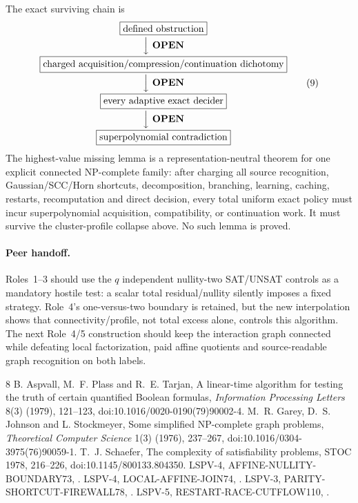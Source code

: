 \documentclass[11pt]{article}
\newcommand{\OPEN}{\textbf{OPEN}}
\begin{document}
The exact surviving chain is
\[
\begin{gathered}
\boxed{\text{defined obstruction}}\\[-2pt]
\Big\downarrow\ {\OPEN}\\[-2pt]
\boxed{\text{charged acquisition/compression/continuation dichotomy}}\\[-2pt]
\Big\downarrow\ {\OPEN}\\[-2pt]
\boxed{\text{every adaptive exact decider}}\\[-2pt]
\Big\downarrow\ {\OPEN}\\[-2pt]
\boxed{\text{superpolynomial contradiction}}
\end{gathered}                                                       \tag{9}
\]
The highest-value missing lemma is a representation-neutral theorem for one
explicit connected NP-complete family: after charging all source recognition,
Gaussian/SCC/Horn shortcuts, decomposition, branching, learning, caching,
restarts, recomputation and direct decision, every total uniform exact policy
must incur superpolynomial acquisition, compatibility, or continuation work.
It must survive the cluster-profile collapse above.  No such lemma is proved.

\paragraph{Peer handoff.}
Roles~1--3 should use the $q$ independent nullity-two SAT/UNSAT controls as a
mandatory hostile test: a scalar total residual/nullity silently imposes a
fixed strategy.  Role~4's one-versus-two boundary is retained, but the new
interpolation shows that connectivity/profile, not total excess alone,
controls this algorithm.  The next Role~4/5 construction should keep the
interaction graph connected while defeating local factorization, paid affine
quotients and source-readable graph recognition on both labels.

\begin{thebibliography}{8}
 B. Aspvall, M.~F. Plass and R.~E. Tarjan,
A linear-time algorithm for testing the truth of certain quantified Boolean
formulas, \emph{Information Processing Letters} 8(3) (1979), 121--123,
doi:10.1016/0020-0190(79)90002-4.
 M.~R. Garey, D.~S. Johnson and L. Stockmeyer,
Some simplified NP-complete graph problems,
\emph{Theoretical Computer Science} 1(3) (1976), 237--267,
doi:10.1016/0304-3975(76)90059-1.
 T.~J. Schaefer, The complexity of satisfiability problems,
STOC 1978, 216--226, doi:10.1145/800133.804350.
 LSPV-4, AFFINE-NULLITY-BOUNDARY73,
.
 LSPV-4, LOCAL-AFFINE-JOIN74,
.
 LSPV-3, PARITY-SHORTCUT-FIREWALL78,
.
 LSPV-5, RESTART-RACE-CUTFLOW110,
.
\end{thebibliography}
\end{document}
